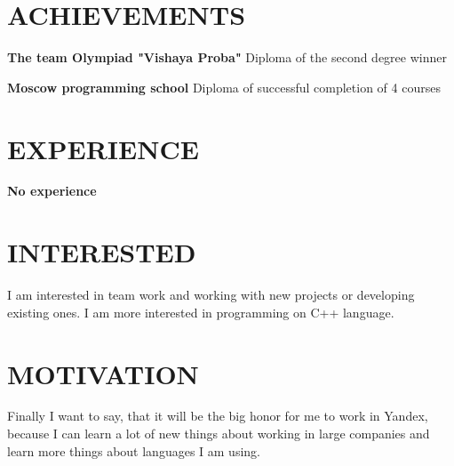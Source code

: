\documentclass[margin]{res}
\begin{document}
\begin{resume}

\section{ACHIEVEMENTS}

\textbf{The team Olympiad "Vishaya Proba"}
Diploma of the second degree winner

\textbf{Moscow programming school}
Diploma of successful completion of 4 courses


\section{EXPERIENCE}

\textbf{No experience}

\section{INTERESTED}

I am interested in team work and working with new projects or developing existing ones. I am more interested in programming on C++ language.

\section{MOTIVATION}

Finally I want to say, that it will be the big honor for me to work in Yandex, because I can learn a lot of new things about working in large companies and learn more things about languages I am using.

\end{resume}
\end{document}
